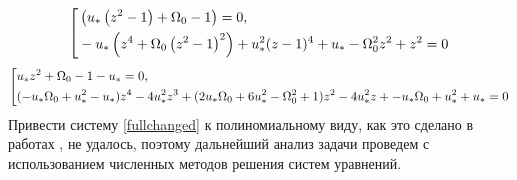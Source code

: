 \documentclass[a4paper,14pt]{article}
\theoremstyle{plain} %
\theoremstyle{definition} %
\theoremstyle{remark} %
\begin{document}
{\begin{equation}
    \left[ {\begin{aligned}
                 & \left(u_* \left(z^2-1\right)+\Omega _0-1\right)=0, \hfill    \\
                 & -u_* \left(z^4+\Omega _0 \left(z^2-1\right)^2\right)+u_*^2 (z-1)^4+u_*-\Omega _0^2 z^2+z^2=0 \hfill    \\
            \end{aligned}} \right.
\end{equation}
\begin{equation}\label{fullchanged2}
    \left[ {\begin{aligned}
                 & u_*z^2+\Omega _0-1-u_*=0, \hfill    \\
                 & (-u_* \Omega _0+u_*^2-u_*)z^4-4 u_*^2z^3+(2 u_* \Omega _0+6 u_*^2-\Omega _0^2+1)z^2-4 u_*^2z+-u_* \Omega _0+u_*^2+u_*=0 \hfill    \\
            \end{aligned}} \right.
\end{equation}
Привести систему \eqref{fullchanged} к полиномиальному виду, как это сделано в работах \cite{PAKrychinin,kurscah}, не удалось, поэтому
дальнейший анализ задачи проведем с использованием численных методов решения систем уравнений.

}
\end{document}
